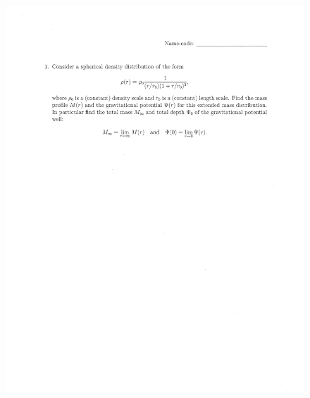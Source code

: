 \documentclass[10pt,a4paper]{article}
\begin{document}
\begin{figure}[H]
 \centering
 \includegraphics[width=16cm]{pdf/1-1T52.png}
\end{figure}
 \newpage
\end{document}
